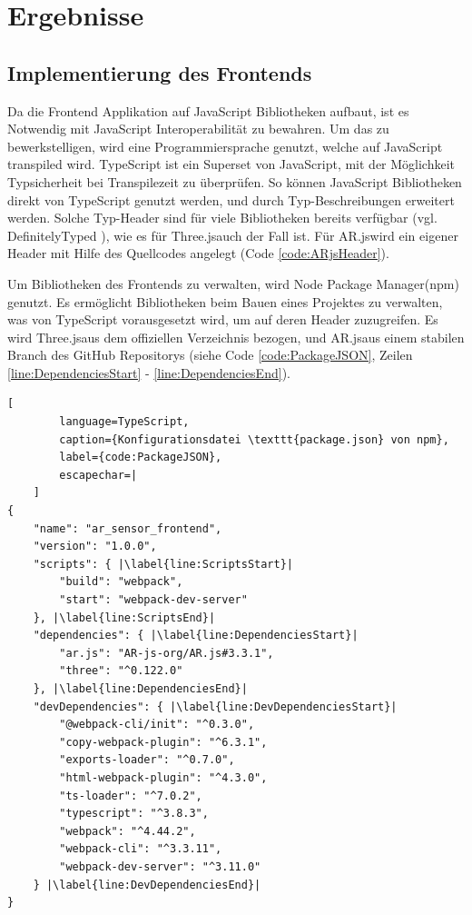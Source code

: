 \section{Ergebnisse}


\subsection{Implementierung des Frontends}

Da die Frontend Applikation auf JavaScript Bibliotheken aufbaut,
ist es Notwendig mit JavaScript Interoperabilität zu bewahren.
Um das zu bewerkstelligen, wird eine Programmiersprache genutzt,
welche auf JavaScript transpiled wird. TypeScript ist ein
Superset von JavaScript, mit der Möglichkeit Typsicherheit bei
Transpilezeit zu überprüfen. So können JavaScript Bibliotheken
direkt von TypeScript genutzt werden, und durch Typ-Beschreibungen
erweitert werden. Solche Typ-Header sind für viele Bibliotheken
bereits verfügbar (vgl. DefinitelyTyped \cite{DefinitelyTyped}),
wie es für \grqq Three.js\grqq\space auch der Fall ist. Für
\grqq AR.js\grqq\space wird ein eigener Header mit Hilfe des
Quellcodes angelegt (Code \ref{code:ARjsHeader}).

\bigskip



Um Bibliotheken des Frontends zu verwalten, wird \grqq Node
Package Manager\grqq\space (npm) genutzt. Es ermöglicht
Bibliotheken beim Bauen eines Projektes zu verwalten, was von
TypeScript vorausgesetzt wird, um auf deren Header zuzugreifen.
Es wird \grqq Three.js\grqq\space aus dem offiziellen Verzeichnis
bezogen, und \grqq AR.js\grqq\space aus einem stabilen Branch des
GitHub Repositorys (siehe Code \ref{code:PackageJSON}, Zeilen
\ref{line:DependenciesStart} - \ref{line:DependenciesEnd}).

\begin{codefloat}
	\begin{lstlisting}[
		language=TypeScript,
		caption={Konfigurationsdatei \texttt{package.json} von npm},
		label={code:PackageJSON},
		escapechar=|
	]
{
	"name": "ar_sensor_frontend",
	"version": "1.0.0",
	"scripts": { |\label{line:ScriptsStart}|
		"build": "webpack",
		"start": "webpack-dev-server"
	}, |\label{line:ScriptsEnd}|
	"dependencies": { |\label{line:DependenciesStart}|
		"ar.js": "AR-js-org/AR.js#3.3.1",
		"three": "^0.122.0"
	}, |\label{line:DependenciesEnd}|
	"devDependencies": { |\label{line:DevDependenciesStart}|
		"@webpack-cli/init": "^0.3.0",
		"copy-webpack-plugin": "^6.3.1",
		"exports-loader": "^0.7.0",
		"html-webpack-plugin": "^4.3.0",
		"ts-loader": "^7.0.2",
		"typescript": "^3.8.3",
		"webpack": "^4.44.2",
		"webpack-cli": "^3.3.11",
		"webpack-dev-server": "^3.11.0"
	} |\label{line:DevDependenciesEnd}|
}
	\end{lstlisting}
\end{codefloat}

